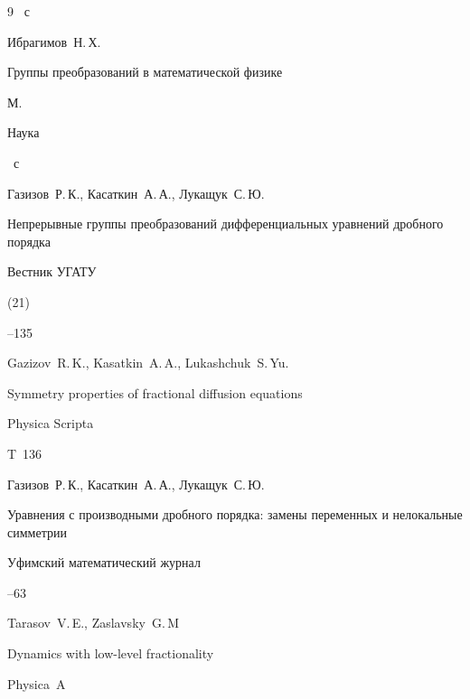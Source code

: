 \begin{thebibliography}{9}
~с

	


\by Ибрагимов~Н.\,Х.

\book Группы преобразований в математической физике

\publaddr М.

\publ Наука


~с

	


\by Газизов~Р.\,К., Касаткин~А.\,А., Лукащук~С.\,Ю.

\paper Непрерывные группы преобразований дифференциальных уравнений дробного порядка

\jour Вестник УГАТУ


 (21)

--135

	


\by Gazizov~R.\,K., Kasatkin~A.\,A., Lukashchuk~S.\,Yu.

\paper Symmetry properties of fractional diffusion equations

\jour  Physica Scripta


\issue T~136


	


\by Газизов~Р.\,К., Касаткин~А.\,А., Лукащук~С.\,Ю.

\paper Уравнения с производными дробного порядка: замены переменных и нелокальные симметрии

\jour Уфимский математический журнал



--63




\by Tarasov~V.\,E., Zaslavsky~G.\,M

\paper Dynamics with low-level fractionality

\jour Physica~A




\end{thebibliography}
